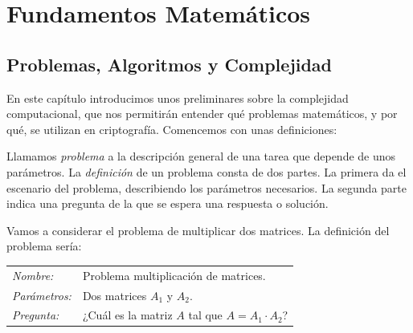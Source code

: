 \part{Fundamentos Matem\'aticos}

\chapter{Problemas, Algoritmos y Complejidad}\label{ch:preliminaresComputacion}







En este capítulo introducimos unos preliminares sobre la complejidad computacional, que nos permitirán entender qué problemas matemáticos, y por qué, se utilizan en criptografía. Comencemos con unas definiciones:

\begin{definition}
	Llamamos \textit{problema} a la descripción general de una tarea que depende de unos parámetros. La \textit{definición} de un problema consta de dos partes. La primera da el escenario del problema, describiendo los parámetros necesarios. La segunda parte indica una pregunta de la que se espera una respuesta o solución.
\end{definition}

\begin{example}
	Vamos a considerar el problema de multiplicar dos matrices. La definición del problema sería:

	\begin{tabular}{|ll}
		\textit{Nombre:} & Problema multiplicación de matrices. \\
		\textit{Parámetros:} & Dos matrices $A_1$ y $A_2$. \\
		\textit{Pregunta:} & ¿Cuál es la matriz $A$ tal que $A=A_1 \cdot A_2$? \\
	\end{tabular}
\end{example}

